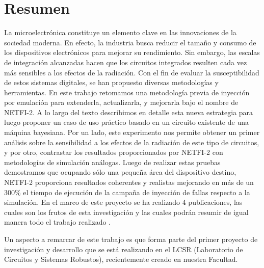 \documentclass[a4paper,openright,12pt]{report}
\begin{document}
\chapter*{Resumen} %
La microelectrónica constituye un elemento clave en las innovaciones de la sociedad moderna. En efecto, la industria busca reducir el tamaño y consumo de los dispositivos electrónicos para mejorar su rendimiento. Sin embargo, las escalas de integración alcanzadas hacen que los circuitos integrados resulten cada vez más sensibles a los efectos de la radiación. Con el fin de evaluar la susceptibilidad de estos sistemas digitales, se han propuesto diversas metodologías y herramientas. En este trabajo retomamos una metodología previa de inyección por emulación para extenderla, actualizarla, y mejorarla bajo el nombre de NETFI-2. A lo largo del texto describimos en detalle esta nueva estrategia para luego proponer un caso de uso práctico basado en un circuito existente de una máquina bayesiana. Por un lado, este experimento nos permite obtener un primer análisis sobre la sensibilidad a los efectos de la radiación de este tipo de circuitos, y por otro, contrastar los resultados proporcionados por NETFI-2 con metodologías de simulación análogas. Luego de realizar estas pruebas demostramos que ocupando sólo una pequeña área del dispositivo destino, NETFI-2 proporciona resultados coherentes y realistas mejorando en más de un 300\% el tiempo de ejecución de la campaña de inyección de fallas respecto a la simulación. En el marco de este proyecto se ha realizado 4 publicaciones, las cuales son los frutos de esta investigación y las cuales podrán resumir de igual manera todo el trabajo realizado \cite{SanLuis} \cite{Alemania} \cite{Alemania2} \cite{Bariloche}.

Un aspecto a remarcar de este trabajo es que forma parte del primer proyecto de investigación y desarrollo que se está realizando en el LCSR (Laboratorio de Circuitos y Sistemas Robustos), recientemente creado en nuestra Facultad.

		
\end{document}
